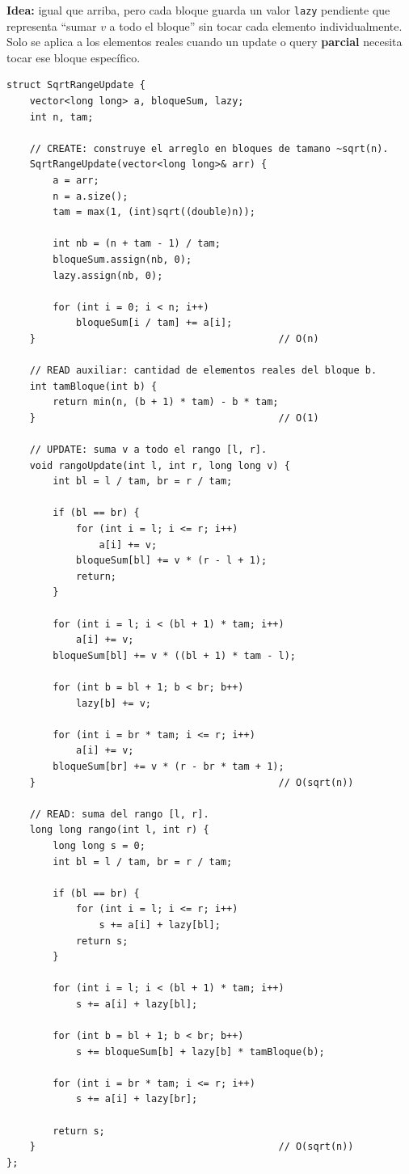 \documentclass[10pt,a4paper,twocolumn]{article}
\begin{document}
\textbf{Idea:} igual que arriba, pero cada bloque guarda un valor
\texttt{lazy} pendiente que representa ``sumar $v$ a todo el bloque''
sin tocar cada elemento individualmente. Solo se aplica a los
elementos reales cuando un update o query \textbf{parcial} necesita
tocar ese bloque específico.

\begin{lstlisting}[style=cpp]
struct SqrtRangeUpdate {
    vector<long long> a, bloqueSum, lazy;
    int n, tam;

    // CREATE: construye el arreglo en bloques de tamano ~sqrt(n).
    SqrtRangeUpdate(vector<long long>& arr) {
        a = arr;
        n = a.size();
        tam = max(1, (int)sqrt((double)n));

        int nb = (n + tam - 1) / tam;
        bloqueSum.assign(nb, 0);
        lazy.assign(nb, 0);

        for (int i = 0; i < n; i++)
            bloqueSum[i / tam] += a[i];
    }                                          // O(n)

    // READ auxiliar: cantidad de elementos reales del bloque b.
    int tamBloque(int b) {
        return min(n, (b + 1) * tam) - b * tam;
    }                                          // O(1)

    // UPDATE: suma v a todo el rango [l, r].
    void rangoUpdate(int l, int r, long long v) {
        int bl = l / tam, br = r / tam;

        if (bl == br) {
            for (int i = l; i <= r; i++)
                a[i] += v;
            bloqueSum[bl] += v * (r - l + 1);
            return;
        }

        for (int i = l; i < (bl + 1) * tam; i++)
            a[i] += v;
        bloqueSum[bl] += v * ((bl + 1) * tam - l);

        for (int b = bl + 1; b < br; b++)
            lazy[b] += v;

        for (int i = br * tam; i <= r; i++)
            a[i] += v;
        bloqueSum[br] += v * (r - br * tam + 1);
    }                                          // O(sqrt(n))

    // READ: suma del rango [l, r].
    long long rango(int l, int r) {
        long long s = 0;
        int bl = l / tam, br = r / tam;

        if (bl == br) {
            for (int i = l; i <= r; i++)
                s += a[i] + lazy[bl];
            return s;
        }

        for (int i = l; i < (bl + 1) * tam; i++)
            s += a[i] + lazy[bl];

        for (int b = bl + 1; b < br; b++)
            s += bloqueSum[b] + lazy[b] * tamBloque(b);

        for (int i = br * tam; i <= r; i++)
            s += a[i] + lazy[br];

        return s;
    }                                          // O(sqrt(n))
};
\end{lstlisting}
\end{document}

